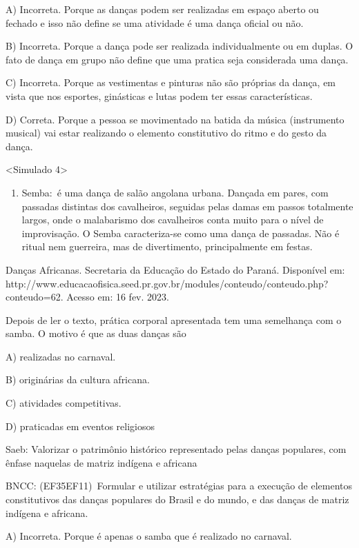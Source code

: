 A) Incorreta. Porque as danças podem ser realizadas em espaço aberto ou
fechado e isso não define se uma atividade é uma dança oficial ou não.

B) Incorreta. Porque a dança pode ser realizada individualmente ou em
duplas. O fato de dança em grupo não define que uma pratica seja
considerada uma dança.

C) Incorreta. Porque as vestimentas e pinturas não são próprias da
dança, em vista que nos esportes, ginásticas e lutas podem ter essas
características.

D) Correta. Porque a pessoa se movimentado na batida da música
(instrumento musical) vai estar realizando o elemento constitutivo do
ritmo e do gesto da dança.

\textless{}Simulado 4\textgreater{}

\begin{enumerate}
\def\labelenumi{\arabic{enumi}.}
\item
  Semba:~é uma dança de salão angolana urbana. Dançada em pares, com
  passadas distintas dos cavalheiros, seguidas pelas damas em passos
  totalmente largos, onde o malabarismo dos cavalheiros conta muito para
  o nível de improvisação. O Semba caracteriza-se como uma dança de
  passadas. Não é ritual nem guerreira, mas de divertimento,
  principalmente em festas.
\end{enumerate}

Danças Africanas. Secretaria da Educação do Estado do Paraná. Disponível
em:
http://www.educacaofisica.seed.pr.gov.br/modules/conteudo/conteudo.php?conteudo=62.
Acesso em: 16 fev. 2023.

Depois de ler o texto, prática corporal apresentada tem uma semelhança
com o samba. O motivo é que as duas danças são

A) realizadas no carnaval.

B) originárias da cultura africana.

C) atividades competitivas.

D) praticadas em eventos religiosos

Saeb: Valorizar o patrimônio histórico representado pelas danças
populares, com ênfase naquelas de matriz indígena e africana

BNCC: (EF35EF11)~Formular e utilizar estratégias para a execução de
elementos constitutivos das danças populares do Brasil e do mundo, e das
danças de matriz indígena e africana.

A) Incorreta. Porque é apenas o samba que é realizado no carnaval.

